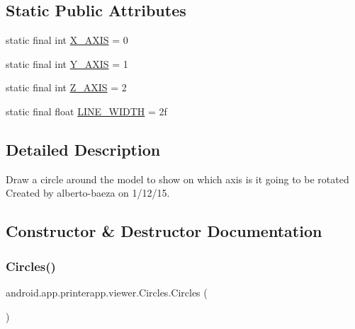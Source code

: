 \subsection*{Static Public Attributes}
\begin{DoxyCompactItemize}
\item 
static final int \hyperlink{classandroid_1_1app_1_1printerapp_1_1viewer_1_1_circles_a4efe59e392df8a53e6f9bb6cb3a78741}{X\+\_\+\+A\+X\+IS} = 0
\item 
static final int \hyperlink{classandroid_1_1app_1_1printerapp_1_1viewer_1_1_circles_a17e77d9ac3b2bd0e0d080b1e9281fcfa}{Y\+\_\+\+A\+X\+IS} = 1
\item 
static final int \hyperlink{classandroid_1_1app_1_1printerapp_1_1viewer_1_1_circles_aa12ab4eb76d047b936b5587da14e2f7e}{Z\+\_\+\+A\+X\+IS} = 2
\item 
static final float \hyperlink{classandroid_1_1app_1_1printerapp_1_1viewer_1_1_circles_a0f07ad78057b7f42c10cb0b9bdc76de8}{L\+I\+N\+E\+\_\+\+W\+I\+D\+TH} = 2f
\end{DoxyCompactItemize}


\subsection{Detailed Description}
Draw a circle around the model to show on which axis is it going to be rotated Created by alberto-\/baeza on 1/12/15. 

\subsection{Constructor \& Destructor Documentation}
\mbox{\label{classandroid_1_1app_1_1printerapp_1_1viewer_1_1_circles_ae2a856e05c17405d252521fe2c9d5ec2}} 
\subsubsection{\texorpdfstring{Circles()}{Circles()}}
{\footnotesize\ttfamily android.\+app.\+printerapp.\+viewer.\+Circles.\+Circles (\begin{DoxyParamCaption}{ }\end{DoxyParamCaption})}



